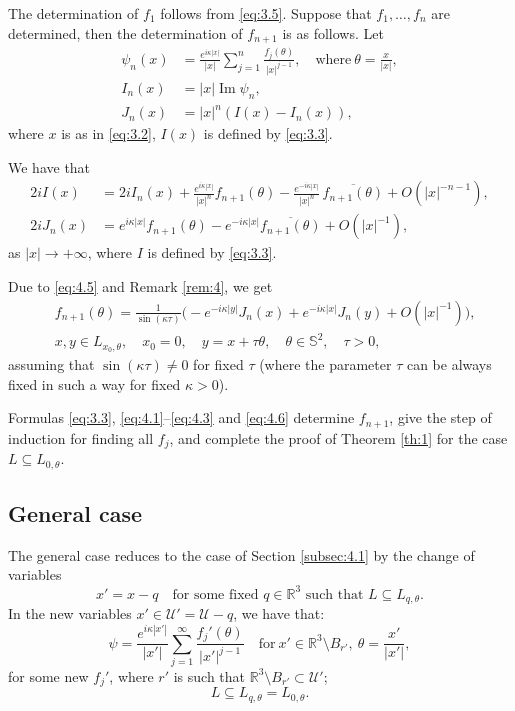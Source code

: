 \documentclass[10pt,a4paper]{amsart}
\newcommand{\RR}{\mathbb R}
\renewcommand{\Im}{\mathop{\mathrm{Im}}}
\theoremstyle{definition}
\begin{document}
The determination of $f_1$ follows from \eqref{eq:3.5}.
Suppose that $f_1,\dots,f_n$ are determined, then the determination of $f_{n+1}$ is as follows.
Let
\begin{align}
\label{eq:4.1}
\psi_n(x)&=\frac{e^{i\kappa|x|}}{|x|}\sum\limits_{j=1}^{n}\frac{f_j(\theta)}{|x|^{j-1}}, \quad \text{where}\ \theta=\frac{x}{|x|},
\\
\label{eq:4.2}
I_n(x)&=|x|\Im\psi_n,
\\
\label{eq:4.3}
J_n(x)&=|x|^n(I(x)-I_n(x)),
\end{align}
where $x$ is as in \eqref{eq:3.2}, $I(x)$ is defined by \eqref{eq:3.3}.

We have that
\begin{align}
\label{eq:4.4}
2iI(x)&=2iI_n(x)+ \frac{e^{i\kappa|x|}}{|x|^n}{f_{n+1}(\theta)}- \frac{e^{-i\kappa|x|}}{|x|^n}\,\overline{f_{n+1}(\theta)}+O(|x|^{-n-1}),
\\
\label{eq:4.5}
2iJ_n(x)&=e^{i\kappa|x|}{f_{n+1}(\theta)} - e^{-i\kappa|x|}\overline{f_{n+1}(\theta)}+O(|x|^{-1}),
\end{align}
as $|x|\to +\infty$, where $I$ is defined by \eqref{eq:3.3}.

Due to \eqref{eq:4.5} and Remark \ref{rem:4}, we get
\begin{equation}\label{eq:4.6}
\begin{aligned}
&f_{n+1}(\theta)= \frac{1}{\sin(\kappa\tau)}\bigl(-e^{-i\kappa|y|}J_n(x)+e^{-i\kappa|x|}J_n(y)+O(|x|^{-1})\bigr),\\
&x,y\in L_{x_0, \theta},\quad x_0=0,\quad y=x+\tau\theta, \quad \theta\in\mathbb S^2,\quad \tau>0,
\end{aligned}
\end{equation}
assuming that $\sin(\kappa\tau)\ne 0$ for fixed $\tau$
(where the parameter $\tau$ can be always fixed in such a way for fixed $\kappa>0$).

Formulas \eqref{eq:3.3}, \eqref{eq:4.1}--\eqref{eq:4.3} and \eqref{eq:4.6} determine $f_{n+1}$, give the step of induction for finding all $f_j$, and complete the proof of Theorem \ref{th:1} for the case $L\subseteq L_{0, \theta}$.

\subsection{General case}
The general case reduces to the case of Section \ref{subsec:4.1} by the change of variables
\begin{equation}
x'=x-q \label{eq:4.7}\quad
\text{for some fixed $q\in\RR^3$ such that $L\subseteq L_{q, \theta}$.}
\end{equation}
In the new variables $x'\in\mathcal{U}'=\mathcal{U}-q$, we have that:
\begin{equation}
\label{eq:4.8}
\psi= \frac{e^{i\kappa|x'|}}{|x'|}\sum\limits_{j=1}^{\infty}\frac{f_j'(\theta)}{|x'|^{j-1}} \quad \text{for}\ x'\in \RR^3\setminus B_{r'}, \ \theta=\frac{x'}{|x'|},
\end{equation}
for some new $f_j'$,
where $r'$ is such that $\RR^3\setminus B_{r'} \subset \mathcal{U}'$;
\begin{equation}
\label{eq:4.9}
L\subseteq L_{q, \theta}=L_{0, \theta}.
\end{equation}
\end{document}
